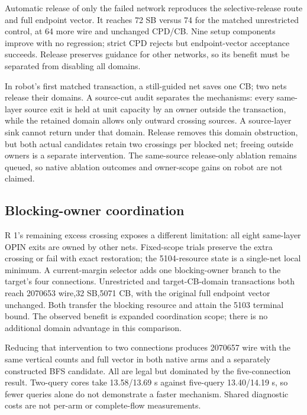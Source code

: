 \documentclass[conference,10pt]{IEEEtran}
\begin{document}
Automatic release of only the failed network reproduces the selective-release route and full endpoint vector. It reaches 72 SB versus 74 for the matched unrestricted control, at 64 more wire and unchanged CPD/CB. Nine setup components improve with no regression; strict CPD rejects but endpoint-vector acceptance succeeds. Release preserves guidance for other networks, so its benefit must be separated from disabling all domains.

In robot's first matched transaction, a still-guided net saves one CB; two nets release their domains. A source-cut audit separates the mechanisms: every same-layer source exit is held at unit capacity by an owner outside the transaction, while the retained domain allows only outward crossing sources. A source-layer sink cannot return under that domain. Release removes this domain obstruction, but both actual candidates retain two crossings per blocked net; freeing outside owners is a separate intervention. The same-source release-only ablation remains queued, so native ablation outcomes and owner-scope gains on robot are not claimed.

\subsection{Blocking-owner coordination}
R 1's remaining excess crossing exposes a different limitation: all eight same-layer OPIN exits are owned by other nets. Fixed-scope trials preserve the extra crossing or fail with exact restoration; the 5104-resource state is a single-net local minimum. A current-margin selector adds one blocking-owner branch to the target's four connections. Unrestricted and target-CB-domain transactions both reach 2070653 wire,32 SB,5071 CB, with the original full endpoint vector unchanged. Both transfer the blocking resource and attain the 5103 terminal bound. The observed benefit is expanded coordination scope; there is no additional domain advantage in this comparison.

Reducing that intervention to two connections produces 2070657 wire with the same vertical counts and full vector in both native arms and a separately constructed BFS candidate. All are legal but dominated by the five-connection result. Two-query cores take 13.58/13.69 s against five-query 13.40/14.19 s, so fewer queries alone do not demonstrate a faster mechanism. Shared diagnostic costs are not per-arm or complete-flow measurements.
\end{document}

